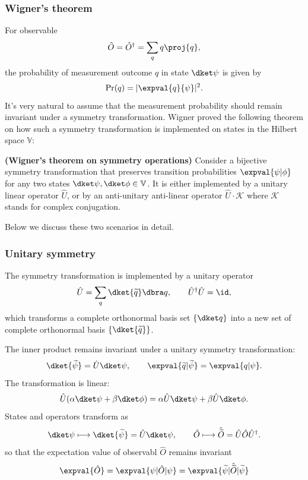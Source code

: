 \subsubsection{Wigner's theorem}

For observable 
\begin{equation}
 \hat O=\hat O^\dagger=\sum_q q\proj{q},
\end{equation}
the probability of measurement outcome $q$ in state $\dket\psi$ is given by
\begin{equation}
 \text{Pr}(q)=|\expval{q}{\psi}|^2.
\end{equation}
It's very natural to assume that the measurement probability should remain invariant under a symmetry transformation. Wigner proved the following theorem on how such a symmetry transformation is implemented on states in the Hilbert space $\mathbb{V}$:

\begin{thm}
  \textbf{(Wigner's theorem on symmetry operations)} Consider a bijective symmetry transformation that preserves transition probabilities $\expval{\psi|\phi}$ for any two states $\dket\psi,\dket\phi\in\mathbb{V}$. It is either implemented by a unitary linear operator $\hat U$, or by an anti-unitary anti-linear operator $\hat U\cdot\mathcal{K}$ where $\mathcal{K}$ stands for complex conjugation.   
\end{thm}
Below we discuss these two scenarios in detail. 

\subsubsection{Unitary symmetry}
The symmetry transformation is implemented by a unitary operator
\begin{equation}
 \hat U=\sum_q\dket{\widetilde q}\dbra q,
 \qquad
 \hat U^\dagger\hat U=\id,
\end{equation}
which transforms a complete orthonormal basis set $\{\dket q\}$ into a new set of complete orthonormal basis $\{\dket{\widetilde q}\}$. 

The inner product remains invariant under a unitary symmetry transformation:
\begin{equation}
 \dket{\widetilde\psi}=\hat U\dket\psi,
 \qquad
 \expval{\widetilde q|\widetilde\psi}=\expval{q|\psi}.
\end{equation}
The transformation is linear:
\begin{equation}
 \hat U(\alpha\dket\psi+\beta\dket\phi)
 =\alpha\hat U\dket\psi+\beta\hat U\dket\phi.
\end{equation}
States and operators transform as
\begin{equation}
 \dket\psi\longmapsto\dket{\widetilde\psi}=\hat U\dket\psi,
 \qquad
 \hat O\longmapsto\hat{\widetilde O}=\hat U\hat O\hat U^\dagger.
\end{equation}
so that the expectation value of observabl $\hat O$ remains invariant
\begin{align}
    \expval{\hat O}=\expval{\psi|\hat O|\psi}=\expval{\widetilde\psi|\hat{\widetilde O}|\widetilde\psi}
\end{align}

